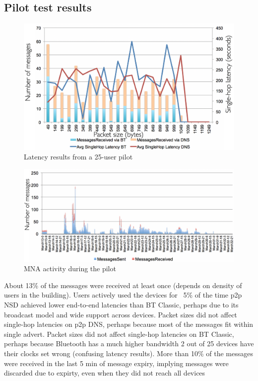 \documentclass[conference]{IEEEtran}
\begin{document}
%

%

%
\subsection{Pilot test results}
\label{sec:romania}
%
\begin{figure}[htbp]
\centerline{\includegraphics[width=\columnwidth]{figs/romania_latency}}
\caption{Latency results from a 25-user pilot}
\label{fig:romania_lat}
\end{figure}

\begin{figure}[htbp]
\centerline{\includegraphics[width=\columnwidth]{figs/romania_activity}}
\caption{MNA activity during the pilot}
\label{fig:romania_act}
\end{figure}


About 13\% of the messages were received at least once (depends on
density of users in the building). Users actively used the devices for
~5\% of the time p2p NSD achieved lower end-to-end latencies than BT
Classic, perhaps due to its broadcast model and wide support across
devices. Packet sizes did not affect single-hop latencies on p2p DNS,
perhaps because most of the messages fit within single advert. Packet
sizes did not affect single-hop latencies on BT Classic, perhaps
because Bluetooth has a much higher bandwidth 2 out of 25 devices have
their clocks set wrong (confusing latency results). More than 10\% of
the messages were received in the last 5 min of message expiry,
implying messages were discarded due to expirty, even when they did
not reach all devices
\end{document}
